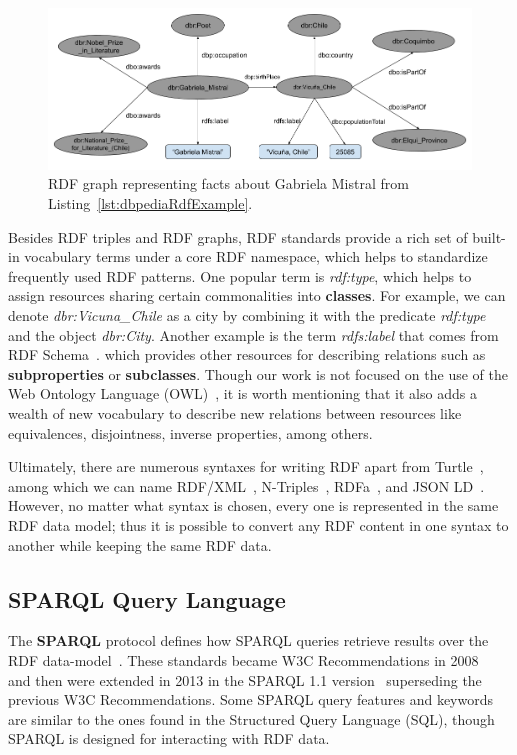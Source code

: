 \begin{figure}[!h]
    \centering
    \includegraphics[scale=.45]{imagenes/2_theorical_framework/exampleDbpediaGraph.png}
    \caption{RDF graph representing facts about Gabriela Mistral from Listing~\ref{lst:dbpediaRdfExample}.}
    \label{fig:dbpediaGraphExample}
\end{figure}

Besides RDF triples and RDF graphs, RDF standards provide a rich set of built-in 
vocabulary terms under a core RDF namespace, which helps to standardize frequently used 
RDF patterns. One popular term is \textit{rdf:type}, which helps to assign resources 
sharing certain commonalities into \textbf{classes}. For example, we can denote 
\textit{dbr:Vicuna\_Chile} as a city by combining it with the predicate \textit{rdf:type} 
and the object \textit{dbr:City}. Another example is the term \textit{rdfs:label} that 
comes from RDF Schema~\cite{key:rdfsold}. which provides other resources for describing 
relations such as \textbf{subproperties} or \textbf{subclasses}. Though our work is not 
focused on the use of the Web Ontology Language (OWL)~\cite{key:owl2rationale, key:owloverview}, 
it is worth mentioning that it also adds a wealth of new vocabulary to describe new 
relations between resources like equivalences, disjointness, inverse properties, among others.

Ultimately, there are numerous syntaxes for writing RDF apart from Turtle~\cite{key:turtle}, among 
which we can name RDF/XML~\cite{key:rdfxml}, N-Triples~\cite{key:testcases}, RDFa~\cite{key:rdfa11p, key:rdfa}, 
and JSON LD~\cite{key:jsonld}. However, no matter what syntax is chosen, every one is 
represented in the same RDF data model; thus it is possible to convert any RDF content 
in one syntax to another while keeping the same RDF data.

\subsection{SPARQL Query Language}
The \textbf{SPARQL} protocol defines how SPARQL queries retrieve results over the RDF 
data-model~\cite{key:sparql11protocol}. These standards became W3C Recommendations in 
2008~\cite{key:sparql} and then were extended in 2013 in the SPARQL 1.1 version~\cite{key:sparql11} 
superseding the previous W3C Recommendations. Some SPARQL query features and keywords are similar 
to the ones found in the Structured Query Language (SQL), though SPARQL is designed for interacting 
with RDF data.

